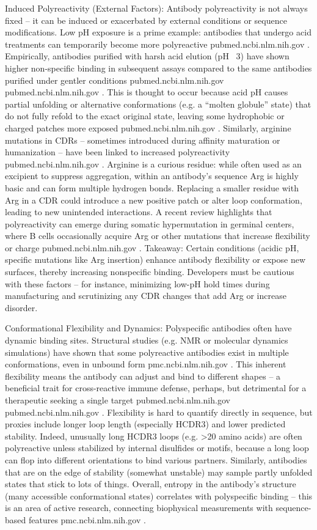 Induced Polyreactivity (External Factors): Antibody polyreactivity is not always fixed – it can be induced or exacerbated by external conditions or sequence modifications. Low pH exposure is a prime example: antibodies that undergo acid treatments can temporarily become more polyreactive
pubmed.ncbi.nlm.nih.gov
. Empirically, antibodies purified with harsh acid elution (pH ~3) have shown higher non-specific binding in subsequent assays compared to the same antibodies purified under gentler conditions
pubmed.ncbi.nlm.nih.gov
pubmed.ncbi.nlm.nih.gov
. This is thought to occur because acid pH causes partial unfolding or alternative conformations (e.g. a “molten globule” state) that do not fully refold to the exact original state, leaving some hydrophobic or charged patches more exposed
pubmed.ncbi.nlm.nih.gov
. Similarly, arginine mutations in CDRs – sometimes introduced during affinity maturation or humanization – have been linked to increased polyreactivity
pubmed.ncbi.nlm.nih.gov
. Arginine is a curious residue: while often used as an excipient to suppress aggregation, within an antibody’s sequence Arg is highly basic and can form multiple hydrogen bonds. Replacing a smaller residue with Arg in a CDR could introduce a new positive patch or alter loop conformation, leading to new unintended interactions. A recent review highlights that polyreactivity can emerge during somatic hypermutation in germinal centers, where B cells occasionally acquire Arg or other mutations that increase flexibility or charge
pubmed.ncbi.nlm.nih.gov
. Takeaway: Certain conditions (acidic pH, specific mutations like Arg insertion) enhance antibody flexibility or expose new surfaces, thereby increasing nonspecific binding. Developers must be cautious with these factors – for instance, minimizing low-pH hold times during manufacturing and scrutinizing any CDR changes that add Arg or increase disorder.

Conformational Flexibility and Dynamics: Polyspecific antibodies often have dynamic binding sites. Structural studies (e.g. NMR or molecular dynamics simulations) have shown that some polyreactive antibodies exist in multiple conformations, even in unbound form
pmc.ncbi.nlm.nih.gov
. This inherent flexibility means the antibody can adjust and bind to different shapes – a beneficial trait for cross-reactive immune defense, perhaps, but detrimental for a therapeutic seeking a single target
pubmed.ncbi.nlm.nih.gov
pubmed.ncbi.nlm.nih.gov
. Flexibility is hard to quantify directly in sequence, but proxies include longer loop length (especially HCDR3) and lower predicted stability. Indeed, unusually long HCDR3 loops (e.g. >20 amino acids) are often polyreactive unless stabilized by internal disulfides or motifs, because a long loop can flop into different orientations to bind various partners. Similarly, antibodies that are on the edge of stability (somewhat unstable) may sample partly unfolded states that stick to lots of things. Overall, entropy in the antibody’s structure (many accessible conformational states) correlates with polyspecific binding – this is an area of active research, connecting biophysical measurements with sequence-based features
pmc.ncbi.nlm.nih.gov
.

